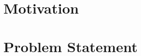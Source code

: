 \documentclass[logo,msc]{infthesis}
\begin{document}
\section{Motivation}
%
%
%
%
%

\section{Problem Statement}
%
%
%
\end{document}
